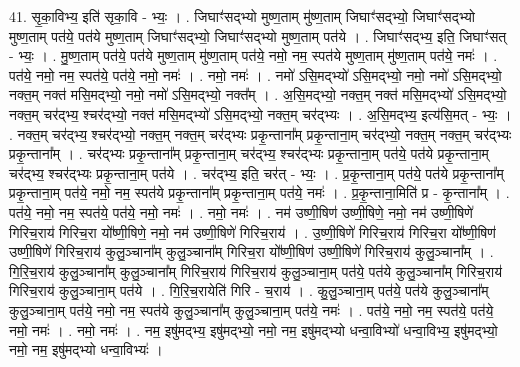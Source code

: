 \documentclass[17pt]{extarticle}
\begin{document}
41. सृ॒का॒विभ्य॒ इति॑ सृका॒वि - भ्यः॒ । . जिघाꣳ॑सद्भ्यो मुष्ण॒ताम् मु॑ष्ण॒ताम् जिघाꣳ॑सद्भ्यो॒ जिघाꣳ॑सद्भ्यो मुष्ण॒ताम् पत॑ये॒ पत॑ये मुष्ण॒ताम् जिघाꣳ॑सद्भ्यो॒ जिघाꣳ॑सद्भ्यो मुष्ण॒ताम् पत॑ये । . जिघाꣳ॑सद्भ्य॒ इति॒ जिघाꣳ॑सत् - भ्यः॒ । . मु॒ष्ण॒ताम् पत॑ये॒ पत॑ये मुष्ण॒ताम् मु॑ष्ण॒ताम् पत॑ये॒ नमो॒ नम॒ स्पत॑ये मुष्ण॒ताम् मु॑ष्ण॒ताम् पत॑ये॒ नमः॑ । . पत॑ये॒ नमो॒ नम॒ स्पत॑ये॒ पत॑ये॒ नमो॒ नमः॑ । . नमो॒ नमः॑ । . नमो॑ ऽसि॒मद्भ्यो॑ ऽसि॒मद्भ्यो॒ नमो॒ नमो॑ ऽसि॒मद्भ्यो॒ नक्त॒म् नक्त॑ मसि॒मद्भ्यो॒ नमो॒ नमो॑ ऽसि॒मद्भ्यो॒ नक्त᳚म् । . अ॒सि॒मद्भ्यो॒ नक्त॒म् नक्त॑ मसि॒मद्भ्यो॑ ऽसि॒मद्भ्यो॒ नक्त॒म् चर॑द्भ्य॒ श्चर॑द्भ्यो॒ नक्त॑ मसि॒मद्भ्यो॑ ऽसि॒मद्भ्यो॒ नक्त॒म् चर॑द्भ्यः । . अ॒सि॒मद्भ्य॒ इत्य॑सि॒मत् - भ्यः॒ । . नक्त॒म् चर॑द्भ्य॒ श्चर॑द्भ्यो॒ नक्त॒म् नक्त॒म् चर॑द्भ्यः प्रकृ॒न्ताना᳚म् प्रकृ॒न्ताना॒म् चर॑द्भ्यो॒ नक्त॒म् नक्त॒म् चर॑द्भ्यः प्रकृ॒न्ताना᳚म् । . चर॑द्भ्यः प्रकृ॒न्ताना᳚म् प्रकृ॒न्ताना॒म् चर॑द्भ्य॒ श्चर॑द्भ्यः प्रकृ॒न्ताना॒म् पत॑ये॒ पत॑ये प्रकृ॒न्ताना॒म् चर॑द्भ्य॒ श्चर॑द्भ्यः प्रकृ॒न्ताना॒म् पत॑ये । . चर॑द्भ्य॒ इति॒ चर॑त् - भ्यः॒ । . प्र॒कृ॒न्ताना॒म् पत॑ये॒ पत॑ये प्रकृ॒न्ताना᳚म् प्रकृ॒न्ताना॒म् पत॑ये॒ नमो॒ नम॒ स्पत॑ये प्रकृ॒न्ताना᳚म् प्रकृ॒न्ताना॒म् पत॑ये॒ नमः॑ । . प्र॒कृ॒न्ताना॒मिति॑ प्र - कृ॒न्ताना᳚म् । . पत॑ये॒ नमो॒ नम॒ स्पत॑ये॒ पत॑ये॒ नमो॒ नमः॑ । . नमो॒ नमः॑ । . नम॑ उष्णी॒षिण॑ उष्णी॒षिणे॒ नमो॒ नम॑ उष्णी॒षिणे॑ गिरिच॒राय॑ गिरिच॒रा यो᳚ष्णी॒षिणे॒ नमो॒ नम॑ उष्णी॒षिणे॑ गिरिच॒राय॑ । . उ॒ष्णी॒षिणे॑ गिरिच॒राय॑ गिरिच॒रा यो᳚ष्णी॒षिण॑ उष्णी॒षिणे॑ गिरिच॒राय॑ कुलु॒ञ्चाना᳚म् कुलु॒ञ्चाना᳚म् गिरिच॒रा यो᳚ष्णी॒षिण॑ उष्णी॒षिणे॑ गिरिच॒राय॑ कुलु॒ञ्चाना᳚म् । . गि॒रि॒च॒राय॑ कुलु॒ञ्चाना᳚म् कुलु॒ञ्चाना᳚म् गिरिच॒राय॑ गिरिच॒राय॑ कुलु॒ञ्चाना॒म् पत॑ये॒ पत॑ये कुलु॒ञ्चाना᳚म् गिरिच॒राय॑ गिरिच॒राय॑ कुलु॒ञ्चाना॒म् पत॑ये । . गि॒रि॒च॒रायेति॑ गिरि - च॒राय॑ । . कु॒लु॒ञ्चाना॒म् पत॑ये॒ पत॑ये कुलु॒ञ्चाना᳚म् कुलु॒ञ्चाना॒म् पत॑ये॒ नमो॒ नम॒ स्पत॑ये कुलु॒ञ्चाना᳚म् कुलु॒ञ्चाना॒म् पत॑ये॒ नमः॑ । . पत॑ये॒ नमो॒ नम॒ स्पत॑ये॒ पत॑ये॒ नमो॒ नमः॑ । . नमो॒ नमः॑ । . नम॒ इषु॑मद्भ्य॒ इषु॑मद्भ्यो॒ नमो॒ नम॒ इषु॑मद्भ्यो धन्वा॒विभ्यो॑ धन्वा॒विभ्य॒ इषु॑मद्भ्यो॒ नमो॒ नम॒ इषु॑मद्भ्यो धन्वा॒विभ्यः॑ । \newline
\pagebreak
{}
\end{document}
